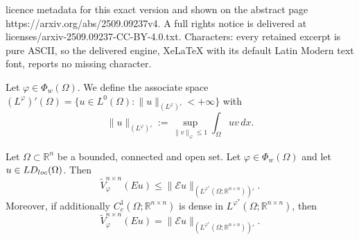 \documentclass[10pt,a4paper]{amsart}
\def\R{\mathbb{R}}
\def\loc{{\rm loc}}
\newcommand{\E}{\mathcal{E}}
\newcommand{\vphi}{\varphi}
\begin{document}
licence metadata for this exact version and shown on the abstract page https://arxiv.org/abs/2509.09237v4. A full rights notice is delivered at licenses/arxiv-2509.09237-CC-BY-4.0.txt. Characters: every retained excerpt is pure ASCII, so the delivered engine, XeLaTeX with its default Latin Modern text font, reports no missing character.
\begin{definition}
\label{def:dual}
    Let $\vphi \in \Phi_w(\Omega)$. We define the associate space $(L^\vphi)'(\Omega)=\{u \in L^0(\Omega):  \|u\|_{(L^\vphi)'}<+\infty\}$ with
    \begin{equation*}
        \|u\|_{(L^\vphi)'} := \sup_{\|v\|_\vphi \le 1} \int_\Omega uv \, dx.
    \end{equation*}
\end{definition}

\begin{lemma}
\label{lem:BV-gradient}
    Let $\Omega \subset \R^n$ be a bounded, connected and open set. Let $\vphi \in \Phi_w(\Omega)$ and let $u \in LD_\loc(\Omega)$. Then
    \begin{equation*}
        \widetilde{V}^{n \times n}_\vphi(Eu) \le \| \E u \|_{(L^{\vphi^*}(\Omega; \R^{n \times n}))'}.
    \end{equation*}
    Moreover, if additionally $C^1_c(\Omega; \R^{n \times n})$ is dense in $L^{\vphi^*}(\Omega; \R^{n \times n})$, then
    \begin{equation*}
        \widetilde{V}^{n \times n}_\vphi(Eu) = \| \E u \|_{(L^{\vphi^*}(\Omega;\R^{n \times n}))'}.
    \end{equation*}
\end{lemma}
\end{document}
